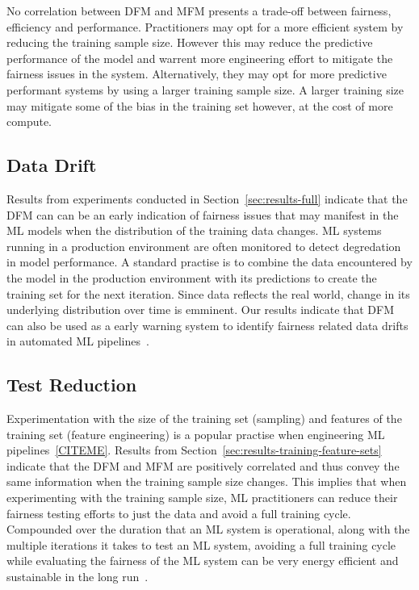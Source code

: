 \documentclass{article}
\begin{document}
No correlation between DFM and MFM presents a trade-off between
fairness, efficiency and performance. Practitioners may opt for a more
efficient system by reducing the training sample size. However this
may reduce the predictive performance of the model and warrent more
engineering effort to mitigate the fairness issues in the system.
Alternatively, they may opt for more predictive performant systems by
using a larger training sample size. A larger training size may
mitigate some of the bias in the training set however, at the cost of
more compute.

\subsection{Data Drift}\label{sec:discuss-data-drift}

Results from experiments conducted in Section \ref{sec:results-full}
indicate that the DFM can can be an early indication of fairness
issues that may manifest in the ML models when the distribution of the
training data changes. ML systems running in a production environment
are often monitored to detect degredation in model performance. A
standard practise is to combine the data encountered by the model in
the production environment with its predictions to create the training
set for the next iteration. Since data reflects the real world, change
in its underlying distribution over time is emminent. Our results
indicate that DFM can also be used as a early warning system to
identify fairness related data drifts in automated ML
pipelines \cite{CITEME}.

\subsection{Test Reduction}\label{sec:discuss-test-red}

Experimentation with the size of the training set (sampling) and
features of the training set (feature engineering) is a popular
practise when engineering ML pipelines \ref{CITEME}. Results from
Section \ref{sec:results-training-feature-sets} indicate that the DFM
and MFM are positively correlated and thus convey the same information
when the training sample size changes. This implies that when
experimenting with the training sample size, ML practitioners can
reduce their fairness testing efforts to just the data and avoid a
full training cycle. Compounded over the duration that an ML system is
operational, along with the multiple iterations it takes to test an ML
system, avoiding a full training cycle while evaluating the fairness
of the ML system can be very energy efficient and sustainable in the
long run \cite{CITME}.
\end{document}
